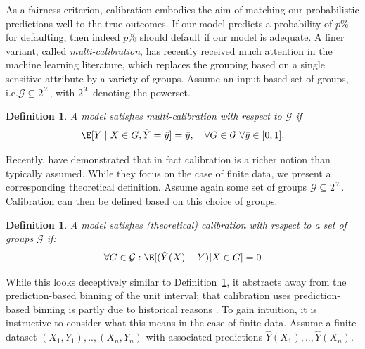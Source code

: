 \documentclass[11pt]{article} %
\makeatletter
\newcommand*{\ie}{i.e.\@\xspace}
\newtheorem{definition}[theorem]{Definition}
\makeatother
\begin{document}
As a fairness criterion, calibration embodies the aim of matching our probabilistic predictions well to the true outcomes. If our model predicts a probability of $p$\% for defaulting, then indeed $p$\% should default if our model is adequate. 
A finer variant, called \textit{multi-calibration}, has recently received much attention in the machine learning literature, which replaces the grouping based on a single sensitive attribute by a variety of groups. 
Assume an input-based set of groups, \ie $\mathcal{G} \subseteq 2^{\mathcal{X}}$, with $2^{\mathcal{X}}$ denoting the powerset.
\begin{definition}
\label{def:multicalibration}
    A model satisfies \emph{multi-calibration} with respect to $\mathcal{G}$ if 
    \begin{equation}
        \E[Y \mid X \in G, \hat{Y}=\hat{y}] = \hat{y}, \quad \forall G \in \mathcal{G} \thinspace \thinspace \forall \hat{y} \in [0,1].
    \end{equation}
\end{definition}
Recently, \citet{holtgen2023richness} have demonstrated that in fact calibration is a richer notion than typically assumed. While they focus on the case of finite data, we present a corresponding theoretical definition. Assume again some set of groups $\mathcal{G} \subseteq 2^{\mathcal{X}}$. Calibration can then be defined based on this choice of groups.
\begin{definition}
\label{def:calibrationtheo}
A model satisfies (theoretical) calibration with respect to a set of groups $\mathcal{G}$ if:
    \begin{align}
\forall G \in \mathcal{G}: \E[(\hat{Y}(X)-Y)|X \in G]=0
\end{align}
\end{definition}
While this looks deceptively similar to Definition~\ref{def:multicalibration}, it abstracts away from the prediction-based binning of the unit interval; that calibration uses prediction-based binning is partly due to historical reasons \citep{holtgen2023richness}.
To gain intuition, it is instructive to consider what this means in the case of finite data.
Assume a finite dataset $(X_1,Y_1),..,(X_n,Y_n)$ with associated predictions $\hat{Y}(X_1),..,\hat{Y}(X_n)$. 
\end{document}
